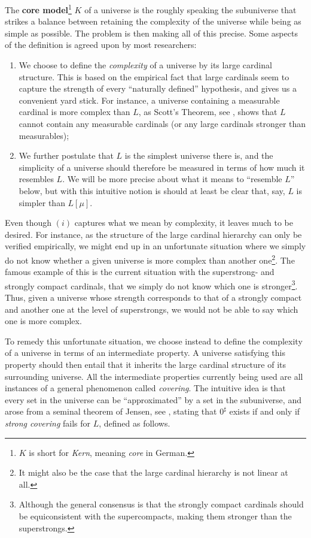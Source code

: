 \documentclass[../../main]{subfiles}
\begin{document}
\qquad The \textbf{core model}\footnote{$K$ is short for \textit{Kern}, meaning \textit{core} in German.} $K$ of a universe is the roughly speaking the subuniverse that strikes a balance between retaining the complexity of the universe while being as simple as possible. The problem is then making all of this precise. Some aspects of the definition is agreed upon by most researchers:
\begin{enumerate}
  \item We choose to define the \textit{complexity} of a universe by its large cardinal structure. This is based on the empirical fact that large cardinals seem to capture the strength of every ``naturally defined'' hypothesis, and gives us a convenient yard stick. For instance, a universe containing a measurable cardinal is more complex than $L$, as Scott's Theorem, see \cite[Corollary 5.5]{Kanamori}, shows that $L$ cannot contain any measurable cardinals (or any large cardinals stronger than measurables);
  \item We further postulate that $L$ is the simplest universe there is, and the simplicity of a universe should therefore be measured in terms of how much it resembles $L$. We will be more precise about what it means to ``resemble $L$'' below, but with this intuitive notion is should at least be clear that, say, $L$ is simpler than $L[\mu]$.\\
\end{enumerate}

Even though $(i)$ captures what we mean by complexity, it leaves much to be desired. For instance, as the structure of the large cardinal hierarchy can only be verified empirically, we might end up in an unfortunate situation where we simply do not know whether a given universe is more complex than another one\footnote{It might also be the case that the large cardinal hierarchy is not linear at all.}. The famous example of this is the current situation with the superstrong- and strongly compact cardinals, that we simply do not know which one is stronger\footnote{Although the general consensus is that the strongly compact cardinals should be equiconsistent with the supercompacts, making them stronger than the superstrongs.}. Thus, given a universe whose strength corresponds to that of a strongly compact and another one at the level of superstrongs, we would not be able to say which one is more complex. 

\qquad To remedy this unfortunate situation, we choose instead to define the complexity of a universe in terms of an intermediate property. A universe satisfying this property should then entail that it inherits the large cardinal structure of its surrounding universe. All the intermediate properties currently being used are all instances of a general phenomenon called \textit{covering}. The intuitive idea is that every set in the universe can be ``approximated'' by a set in the subuniverse, and arose from a seminal theorem of Jensen, see \cite[Theorem 11.56]{SchindlerBook}, stating that $0^\sharp$ exists if and only if \textit{strong covering} fails for $L$, defined as follows.
\end{document}
